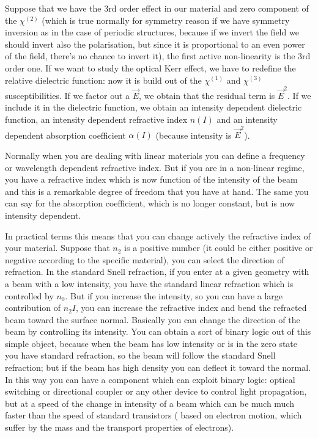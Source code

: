 \documentclass[../main/main.tex]{subfiles}
\begin{document}
Suppose that we have the 3rd order effect in our material and zero component of the $\chi^{(2)}$ (which is true normally for symmetry reason if we have symmetry inversion as in the case of periodic structures, because if we invert the field we should invert also the polarisation, but since it is proportional to an even power of the field, there's no chance to invert it), the first active non-linearity is the 3rd order one.
If we want to study the optical Kerr effect, we have to redefine the relative dielectric function: now it is build out of the $\chi^{(1)}$ and $\chi^{(3)}$ susceptibilities. 
If we factor out a $\vec{E}$, we obtain that the residual term is $\vec{E}^2$. If we include it in the dielectric function, we obtain an intensity dependent dielectric function, an intensity dependent refractive index $n(I)$ and an intensity dependent absorption coefficient $\alpha(I)$ (because intensity is $\vec{E}^2$).

Normally when you are dealing with linear materials you can define a frequency or wavelength dependent refractive index. But if you are in a non-linear regime, you have a refractive index which is now function of the intensity of the beam and this is a remarkable degree of freedom that you have at hand.
The same you can say for the absorption coefficient, which is no longer constant, but is now intensity dependent.

In practical terms this means that you can change actively the refractive index of your material.
Suppose that $n_2$ is a positive number (it could be either positive or negative according to the specific material), you can select the direction of refraction. In the standard Snell refraction, if you enter at a given geometry with a beam with a low intensity, you have the standard linear refraction which is controlled by $n_0$. But if you increase the intensity, so you can have a large contribution of $n_2I$, you can increase the refractive index and bend the refracted beam toward the surface normal. Basically you can change the direction of the beam by controlling its intensity. You can obtain a sort of binary logic out of this simple object, because when the beam has low intensity or is in the zero state you have standard refraction, so the beam will follow the standard Snell refraction; but if the beam has high density you can deflect it toward the normal. In this way you can have a component which can exploit binary logic: optical switching or directional coupler or any other device to control light propagation, but at a speed of the change in intensity of a beam which can be much much faster than the speed of standard transistors ( based on electron motion, which suffer by the mass and the transport properties of electrons).
\end{document}
